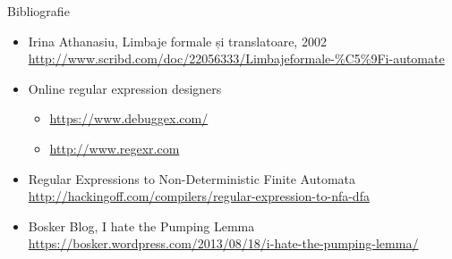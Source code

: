 \documentclass[pdf]{beamer}
\begin{document}
\begin{frame}{Bibliografie}
\begin{itemize}
\item
Irina Athanasiu, Limbaje formale și translatoare, 2002
\url{http://www.scribd.com/doc/22056333/Limbajeformale-\%C5\%9Fi-automate}
\item
Online regular expression designers
\begin{itemize}
\item
\url{https://www.debuggex.com/}
\item
\url{http://www.regexr.com}
\end{itemize}
\item
Regular Expressions to Non-Deterministic Finite Automata
\url{http://hackingoff.com/compilers/regular-expression-to-nfa-dfa}
\item
Bosker Blog, I hate the Pumping Lemma
\url{https://bosker.wordpress.com/2013/08/18/i-hate-the-pumping-lemma/}
\end{itemize}
\end{frame}
\end{document}
